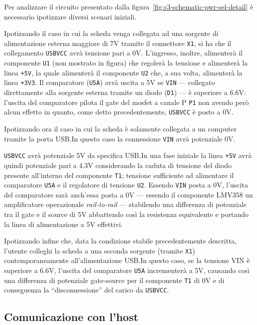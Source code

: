 Per analizzare il circuito presentato dalla figura~\ref{fig:r3-schematic-pwr-sel-detail} è necessario ipotizzare diversi scenari iniziali.

Ipotizzando il caso in cui la scheda venga collegata ad una sorgente di alimentazione esterna maggiore di 7V tramite il connettore \texttt{X1}, si ha che il collegamento \texttt{USBVCC} avrà tensione pari a 0V.
L'ingresso, inoltre, alimenterà il componente \texttt{U1} (non mostrato in figura) che regolerà la tensione e alimenterà la linea \texttt{+5V}, la quale alimenterà il componente \texttt{U2} che, a sua volta, alimenterà la linea \texttt{+3V3}.
Il comparatore (\texttt{U5A}) avrà uscita a 5V se \texttt{VIN} --- collegato direttamente alla sorgente esterna tramite un diodo (\texttt{D1}) --- è superiore a 6.6V: l'uscita del comparatore pilota il gate del mosfet a canale P \texttt{P1} non avendo però alcun effetto in quanto, come detto precedentemente, \texttt{USBVCC} è posto a 0V.

Ipotizzando ora il caso in cui la scheda è solamente collegata a un computer tramite la porta USB.\@ In questo caso la connessione \texttt{VIN} avrà potenziale 0V.

\texttt{USBVCC} avrà potenziale 5V da specifica USB.\@ In una fase iniziale la linea \texttt{+5V} avrà quindi potenziale pari a 4.3V considerando la caduta di tensione del diodo presente all'interno del componente \texttt{T1}; tensione sufficiente ad alimentare il comparatore \texttt{U5A} e il regolatore di tensione \texttt{U2}.
Essendo \texttt{VIN} posta a 0V, l'uscita del comparatore sarà anch'essa posta a 0V --- essendo il componente LMV358 un amplificatore operazionale \textit{rail-to-rail}\cite{ti:lmv358} ---
stabilendo una differenza di potenziale tra il gate e il source di 5V abbattendo così la resistenza equivalente e portando la linea di alimentazione a 5V effettivi\cite{onsemi:fdn340p}.

Ipotizzando infine che, data la condizione stabile precedentemente descritta, l'utente colleghi la scheda a una seconda sorgente (tramite \texttt{X1}) contemporaneamente all'alimentazione USB.\@ In questo caso, se la tensione VIN è superiore a 6.6V, l'uscita del comparatore \texttt{U5A} incrementerà a 5V, causando così una differenza di potenziale gate-source per il componente \texttt{T1} di 0V e di conseguenza la ``disconnessione'' del carico da \texttt{USBVCC}.

\subsection{Comunicazione con l'host}

